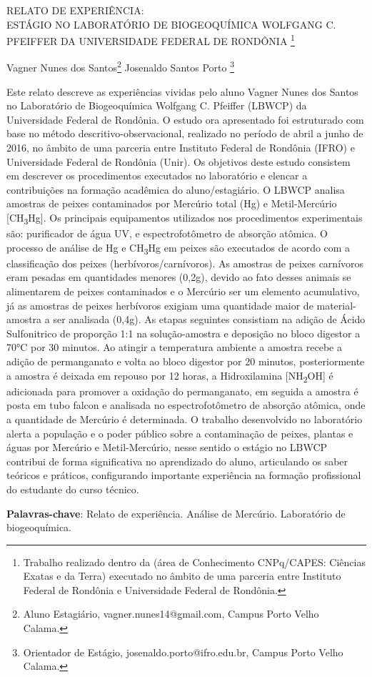 \documentclass[article,12pt,onesidea,4paper,english,brazil]{abntex2}
\begin{document}
	
	
	\frenchspacing 
	
	\begin{center}
		\LARGE RELATO DE EXPERIÊNCIA:\\ESTÁGIO NO LABORATÓRIO DE BIOGEOQUÍMICA WOLFGANG C. PFEIFFER DA UNIVERSIDADE FEDERAL DE RONDÔNIA \footnote{Trabalho realizado dentro da (área de Conhecimento CNPq/CAPES: Ciências Exatas e da Terra) executado no âmbito de uma parceria entre Instituto Federal de Rondônia e Universidade Federal de Rondônia.}
		
		\normalsize
		Vagner Nunes dos Santos\footnote{Aluno Estagiário, vagner.nunes14@gmail.com, Campus Porto Velho Calama.} 
		Josenaldo Santos Porto \footnote{Orientador de Estágio, josenaldo.porto@ifro.edu.br, Campus Porto Velho Calama.} 
		 
	\end{center}
	
	\noindent 
	Este relato descreve as experiências vividas pelo aluno Vagner Nunes dos Santos no Laboratório de Biogeoquímica Wolfgang C. Pfeiffer (LBWCP) da Universidade Federal de Rondônia. O estudo ora apresentado foi estruturado com base no método descritivo-observacional, realizado no período de abril a junho de 2016, no âmbito de uma parceria entre Instituto Federal de Rondônia (IFRO) e Universidade Federal de Rondônia (Unir). Os objetivos deste estudo consistem em descrever os procedimentos executados no laboratório e elencar a contribuições na formação acadêmica do aluno/estagiário. O LBWCP analisa amostras de peixes contaminados por Mercúrio total (Hg) e Metil-Mercúrio [CH\textsubscript{3}Hg]. Os principais equipamentos utilizados nos procedimentos experimentais são: purificador de água UV, e espectrofotômetro de absorção atômica. O processo de análise de Hg e CH\textsubscript{3}Hg em peixes são executados de acordo com a classificação dos peixes (herbívoros/carnívoros). As amostras de peixes carnívoros eram pesadas em quantidades menores (0,2g), devido ao fato desses animais se alimentarem de peixes contaminados e o Mercúrio ser um elemento acumulativo, já as amostras de peixes herbívoros exigiam uma quantidade maior de material-amostra a ser analisada (0,4g).  As etapas seguintes consistiam na adição de Ácido Sulfonitrico de proporção 1:1 na solução-amostra e deposição no bloco digestor a 70°C por 30 minutos. Ao atingir a temperatura ambiente a amostra recebe a adição de permanganato e volta ao bloco digestor por 20 minutos, posteriormente a amostra é deixada em repouso por 12 horas, a Hidroxilamina [NH\textsubscript{2}OH] é adicionada para promover a oxidação do permanganato, em seguida a amostra é posta em tubo falcon e analisada no espectrofotômetro de absorção atômica, onde a quantidade de Mercúrio é determinada. O trabalho desenvolvido no laboratório alerta a população e o poder público sobre a contaminação de peixes, plantas e águas por Mercúrio e Metil-Mercúrio, nesse sentido o estágio no LBWCP contribui de forma significativa no aprendizado do aluno, articulando os saber teóricos e práticos, configurando importante experiência na formação profissional do estudante do curso técnico.
	
	\vspace{\onelineskip}
	
	\noindent
	\textbf{Palavras-chave}: Relato de experiência. Análise de Mercúrio. Laboratório de biogeoquímica.
	
\end{document}
